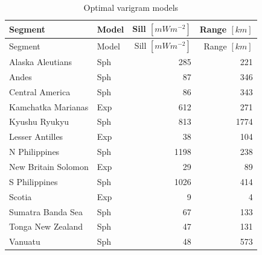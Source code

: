 \documentclass[draft,linenumbers]{agujournal2018}
\begin{document}
\hypertarget{tbl:variogram.summary.table}{}
\begin{longtable}[]{@{}llrr@{}}
\caption{\label{tbl:variogram.summary.table}Optimal varigram
models}\tabularnewline
\toprule
Segment & Model & Sill \([mWm^{-2}]\) & Range \([km]\) \\
\midrule
\endfirsthead
\toprule
Segment & Model & Sill \([mWm^{-2}]\) & Range \([km]\) \\
\midrule
\endhead
Alaska Aleutians & Sph & 285 & 221 \\
Andes & Sph & 87 & 346 \\
Central America & Sph & 86 & 343 \\
Kamchatka Marianas & Exp & 612 & 271 \\
Kyushu Ryukyu & Sph & 813 & 1774 \\
Lesser Antilles & Exp & 38 & 104 \\
N Philippines & Sph & 1198 & 238 \\
New Britain Solomon & Exp & 29 & 89 \\
S Philippines & Sph & 1026 & 414 \\
Scotia & Exp & 9 & 4 \\
Sumatra Banda Sea & Sph & 67 & 133 \\
Tonga New Zealand & Sph & 47 & 131 \\
Vanuatu & Sph & 48 & 573 \\
\bottomrule
\end{longtable}
\end{document}
